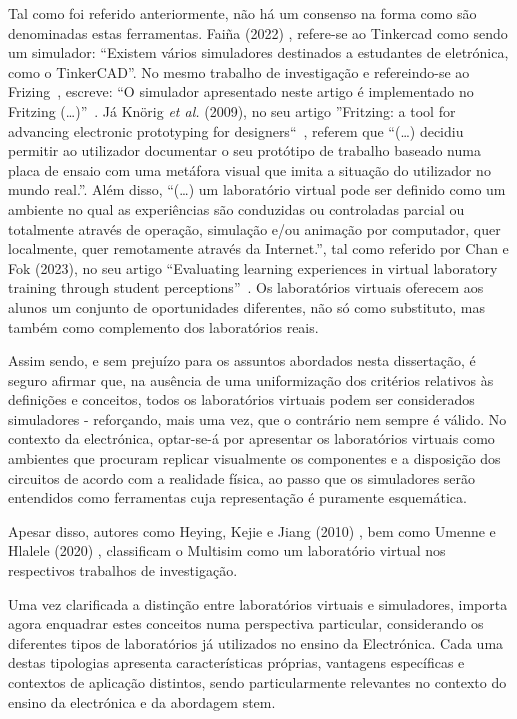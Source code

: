 Tal como foi referido anteriormente, não há um consenso na forma como são denominadas estas ferramentas. Faiña (2022) \cite{faina}, refere-se ao Tinkercad como sendo um simulador: ``Existem vários simuladores destinados a estudantes de eletrónica, como o TinkerCAD''. No mesmo trabalho de investigação e refereindo-se ao Frizing~\cite{fritzingdown}, escreve: ``O simulador apresentado neste artigo é implementado no Fritzing (\ldots)''~\cite{faina}. Já Knörig \textit{et al.} (2009), no seu artigo ''Fritzing: a tool for advancing electronic prototyping for designers``~\cite{Knorig2009Feb}, referem que ``(\ldots) decidiu permitir ao utilizador documentar o seu protótipo de trabalho baseado numa placa de ensaio com uma metáfora visual que imita a situação do utilizador no mundo real.''. Além disso, ``(\ldots) um laboratório virtual pode ser definido como um ambiente no qual as experiências são conduzidas ou controladas parcial ou totalmente através de operação, simulação e/ou animação por computador, quer localmente, quer remotamente através da Internet.'', tal como referido por Chan e Fok (2023), no seu artigo ``Evaluating learning experiences in virtual laboratory training through student perceptions''~\cite{EvaluatingLearningExperiencesVirtualLaboratoryHongKong}. Os laboratórios virtuais oferecem aos alunos um conjunto de oportunidades diferentes, não só como substituto, mas também como complemento dos laboratórios reais.

Assim sendo, e sem prejuízo para os assuntos abordados nesta dissertação, é seguro afirmar que, na ausência de uma uniformização dos critérios relativos às definições e conceitos, todos os laboratórios virtuais podem ser considerados simuladores - reforçando, mais uma vez, que o contrário nem sempre é válido. No contexto da electrónica, optar-se-á por apresentar os laboratórios virtuais como ambientes que procuram replicar visualmente os componentes e a disposição dos circuitos de acordo com a realidade física, ao passo que os simuladores serão entendidos como ferramentas cuja representação é puramente esquemática.

Apesar disso, autores como Heying, Kejie e Jiang (2010) \cite{multisimVLHeying}, bem como Umenne e Hlalele (2020) \cite{multisimVLUmenne}, classificam o Multisim \cite{multisim} como um laboratório virtual nos respectivos trabalhos de investigação.

Uma vez clarificada a distinção entre laboratórios virtuais e simuladores, importa agora enquadrar estes conceitos numa perspectiva particular, considerando os diferentes tipos de laboratórios já utilizados no ensino da Electrónica. Cada uma destas tipologias apresenta características próprias, vantagens específicas e contextos de aplicação distintos, sendo particularmente relevantes no contexto do ensino da electrónica e da abordagem \acrshort{stem}.

